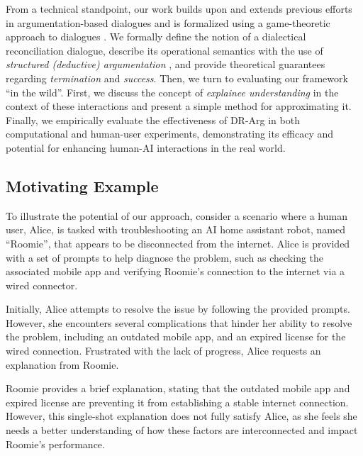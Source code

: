 \documentclass{article}
\begin{document}
From a technical standpoint, our work builds upon and extends previous efforts in argumentation-based dialogues \citep{black2021argumentation} and is formalized using a game-theoretic approach to dialogues \citep{hamblin1970fallacies,hamblin1971mathematical}. We formally define the notion of a dialectical reconciliation dialogue, describe its operational semantics with the use of \emph{structured (deductive) argumentation} \citep{besnard2001logic}, and provide theoretical guarantees regarding \textit{termination} and \textit{success}. %
Then, we turn to evaluating our framework ``in the wild''.
First, 
we discuss the concept of \textit{explainee understanding} in the context of these interactions and present a simple method for approximating it. Finally, we empirically evaluate the effectiveness of DR-Arg in both computational and human-user experiments, demonstrating its efficacy and potential for enhancing human-AI interactions in the real world.











\subsection{Motivating Example}
\label{sec:motivating-example}


To illustrate the potential of our approach, consider a scenario where a human user, Alice, is tasked with troubleshooting an AI home assistant robot, named ``Roomie'', that appears to be disconnected from the internet. Alice is provided with a set of prompts to help diagnose the problem, such as checking the associated mobile app and verifying Roomie's connection to the internet via a wired connector.

Initially, Alice attempts to resolve the issue by following the provided prompts. However, she encounters several complications that hinder her ability to resolve the problem, including an outdated mobile app, and an expired license for the wired connection.
Frustrated with the lack of progress, Alice requests an explanation from Roomie.

Roomie provides a brief explanation, stating that the outdated mobile app and expired license are preventing it from establishing a stable internet connection.
However, this single-shot explanation does not fully satisfy Alice, as she feels she needs a better understanding of how these factors are interconnected and impact Roomie's performance.
\end{document}
